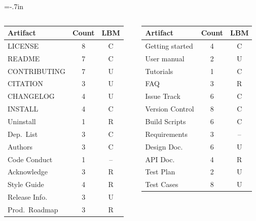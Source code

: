 \documentclass[usenames,dvipsnames]{beamer}
\begin{document}
\hoffset=-.7in %
\begin{frame}[plain]


\begin{columns}
\begin{column}{0.61\textwidth}
\begin{tabular}{ p{2.75cm}cc }
	\toprule
	Artifact & Count & LBM\\
	\midrule
	LICENSE & 8 & C\\
	README & 7 & C\\
	CONTRIBUTING & 7 & U\\
	CITATION & 3 & U\\
	CHANGELOG & 4 & U\\
	INSTALL & 4 & C\\
	\midrule
	Uninstall & 1 & R\\
	Dep.\ List & 3 & C\\
	Authors & 3 & C\\
	Code Conduct & 1 & --\\
	Acknowledge & 3 & R\\
	Style Guide & 4 & R\\
	Release Info. & 3 & U\\
	Prod.\ Roadmap & 3 & R\\
	\bottomrule
	\end{tabular}
\end{column}
\begin{column}{0.39\textwidth}
  \begin{tabular}{ p{2.75cm}cc }
    \toprule
    Artifact & Count & LBM\\
    \midrule
    Getting started & 4 & C\\
    User manual & 2 & U\\
    Tutorials & 1 & C\\
    FAQ & 3 & R\\
    \midrule
    Issue Track & 6 & C\\
    Version Control & 8 & C\\ 
    Build Scripts & 6 & C\\
    \midrule
    Requirements & 3 & --\\
    Design Doc.\ & 6 & U\\
    API Doc. & 4 & R\\
    Test Plan & 2 & U\\
    Test Cases & 8 & U\\
    \bottomrule
    \end{tabular}
  \end{column}
\end{columns}


\end{frame}
\end{document}
